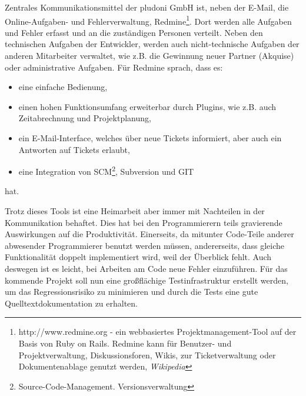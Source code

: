 Zentrales Kommunikationsmittel der pludoni GmbH ist, neben der E-Mail, die Online-Aufgaben- und Fehlerverwaltung, Redmine\footnote{http://www.redmine.org - ein webbasiertes Projektmanagement-Tool auf der Basis von Ruby on Rails. Redmine kann für Benutzer- und Projektverwaltung, Diskussionsforen, Wikis, zur Ticketverwaltung oder Dokumentenablage genutzt werden, \textit{Wikipedia}}. Dort werden alle Aufgaben und Fehler erfasst und an die zuständigen Personen verteilt. 
Neben den technischen Aufgaben der Entwickler, werden auch nicht-technische Aufgaben der anderen Mitarbeiter verwaltet, wie z.B. die Gewinnung neuer Partner (Akquise) oder administrative Aufgaben. Für Redmine sprach, dass es:
\begin{itemize}
\item  eine einfache Bedienung,
\item  einen hohen Funktionsumfang erweiterbar durch Plugins, wie z.B. auch Zeitabrechnung und Projektplanung,
\item  ein E-Mail-Interface, welches über neue Tickets informiert, aber auch ein Antworten auf Tickets erlaubt,
\item  eine Integration von SCM\footnote{Source-Code-Management. Versionsverwaltung}, Subversion und GIT \end{itemize}
hat.

Trotz dieses Tools ist eine Heimarbeit aber immer mit Nachteilen in der Kommunikation behaftet. Dies hat bei den Programmierern teils gravierende Auswirkungen auf die Produktivität. Einerseits, da mitunter Code-Teile anderer abwesender Programmierer benutzt werden müssen,  andererseits, dass gleiche Funktionalität doppelt implementiert wird, weil der Überblick fehlt. Auch deswegen ist es leicht, bei Arbeiten am Code neue Fehler einzuführen. 
Für das kommende Projekt soll nun eine großflächige Testinfrastruktur erstellt werden, um das Regressionsrisiko zu minimieren und durch die Tests eine gute Quelltextdokumentation zu erhalten.

